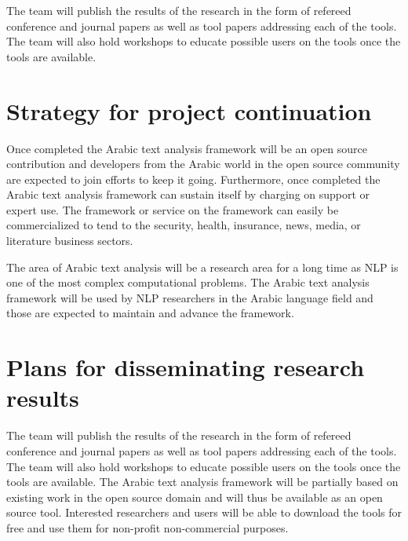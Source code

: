 \documentclass[12pt]{article}
\begin{document}
The team will publish the results of the research in the form of refereed conference and journal papers as well as tool papers addressing each of the tools.
 The team will also hold workshops to educate possible users on the tools once the tools are available.



\section{Strategy for project continuation}
\label{s:continue}


Once completed the Arabic text analysis framework will be an open source contribution and developers from the Arabic world in the open source community are expected to join efforts to keep it going.
 Furthermore, once completed the Arabic text analysis framework can sustain itself by charging on support or expert use.
 The framework or service on the framework can easily be commercialized to tend to the security, health, insurance, news, media, or literature business sectors.
 
The area of Arabic text analysis will be a research area for a long time as NLP is one of the most complex computational problems.
 The Arabic text analysis framework will be used by NLP researchers in the Arabic language field and those are expected to maintain and advance the framework.




\section{Plans for disseminating research results}
\label{s:dissem}

The team will publish the results of the research in the form 
of refereed conference and journal papers as well as tool papers 
addressing each of the tools. 
The team will also hold workshops to educate possible users on the 
tools once the tools are available.
The Arabic text analysis framework will be partially based on 
existing work in the open source domain and will thus be available 
as an open source tool. 
Interested researchers and users will be able to download the tools 
for free and use them for non-profit non-commercial purposes.  

\pagebreak
%
%

%
{\small
  
}
\end{document}
